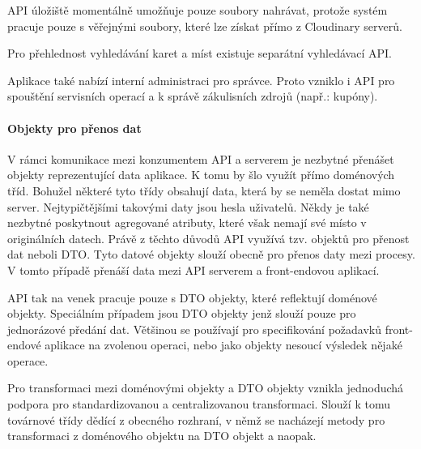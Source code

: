 			\ac{API} úložiště momentálně umožňuje pouze soubory nahrávat, protože systém pracuje pouze s věřejnými soubory, které
			lze získat přímo z Cloudinary serverů.


			Pro přehlednost vyhledávání karet a míst existuje separátní vyhledávací \ac{API}.


			Aplikace také nabízí interní administraci pro správce.
			Proto vzniklo i \ac{API} pro spouštění servisních operací a k správě zákulisních zdrojů (např.: kupóny).


			\paragraph{Objekty pro přenos dat}

			V rámci komunikace mezi konzumentem \ac{API} a serverem je nezbytné přenášet objekty reprezentující data
			aplikace.
			K tomu by šlo využít přímo doménových tříd.
			Bohužel některé tyto třídy obsahují data, která by se neměla dostat mimo server.
			Nejtypičtějšími takovými daty jsou hesla uživatelů.
			Někdy je také nezbytné poskytnout agregované atributy, které však nemají své místo v originálních datech.
			Právě z těchto důvodů \ac{API} využívá tzv. objektů pro přenost dat neboli \ac{DTO}.
			Tyto datové objekty slouží obecně pro přenos daty mezi procesy.
			V tomto případě přenáší data mezi \ac{API} serverem a front-endovou aplikací.

			\ac{API} tak na venek pracuje pouze s \ac{DTO} objekty, které reflektují doménové objekty.
			Speciálním případem jsou \ac{DTO} objekty jenž slouží pouze pro jednorázové předání dat.
			Většinou se používají pro specifikování požadavků front-endové aplikace na zvolenou operaci, nebo jako
			objekty nesoucí výsledek nějaké operace.

			Pro transformaci mezi doménovými objekty a \ac{DTO} objekty vznikla jednoduchá podpora pro standardizovanou
			a centralizovanou transformaci.
			Slouží k tomu továrnové třídy dědící z obecného rozhraní, v němž se nacházejí metody pro transformaci z doménového
			objektu na \ac{DTO} objekt a naopak.

